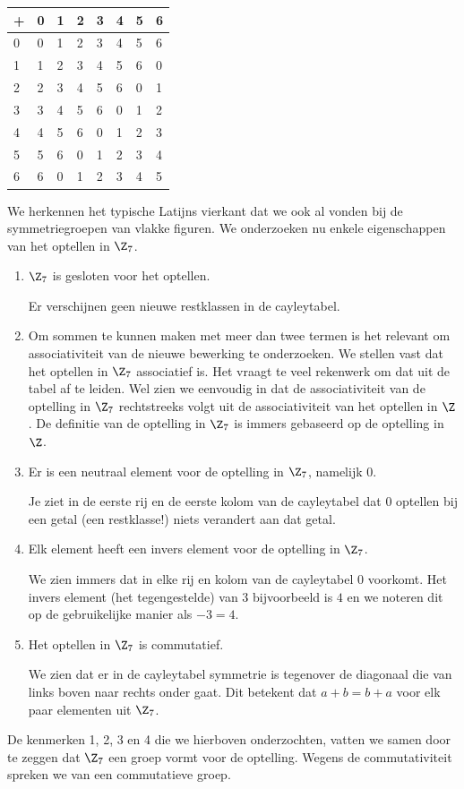 \begin{multicols}{2}
	\begin{tabel}
		\begin{tabular}{|C{0.5cm}|C{0.5cm}|C{0.5cm}|C{0.5cm}|C{0.5cm}|C{0.5cm}|C{0.5cm}|C{0.5cm}|}  
			\hline
			 +&0&1&2&3&4&5&6\\
			\hline 
			0&0&1&2&3&4&5&6\\
			1&1&2&3&4&5&6&0\\
			2&2&3&4&5&6&0&1\\
			3&3&4&5&6&0&1&2\\
			4&4&5&6&0&1&2&3\\
			5&5&6&0&1&2&3&4\\
			6&6&0&1&2&3&4&5\\
			\hline
		\end{tabular}
	\end{tabel}		
	
	We herkennen het typische Latijns vierkant dat we ook al vonden bij de symmetriegroepen van vlakke figuren. We onderzoeken nu enkele eigenschappen van het optellen in $\Z_7$.
		\begin{enumerate}
		\item $\Z_7$ is gesloten voor het optellen.\par
		Er verschijnen geen nieuwe restklassen in de cayleytabel.
		\item Om sommen te kunnen maken met meer dan twee termen is het relevant om associativiteit van de nieuwe bewerking te onderzoeken. We stellen vast dat het optellen in $\Z_7$ associatief is. Het vraagt te veel rekenwerk om dat uit de tabel af te leiden. Wel zien we eenvoudig in dat de associativiteit van de optelling in  $\Z_7$ rechtstreeks volgt uit de associativiteit van het optellen in $\Z$. De definitie van de optelling in $\Z_7$ is immers gebaseerd op de optelling in $\Z$.
		\item Er is een neutraal element voor de optelling in $\Z_7$, namelijk $0$. \par
		Je ziet in de eerste rij en de eerste kolom van de cayleytabel dat $0$ optellen bij een getal (een restklasse!) niets verandert aan dat getal.
		\item Elk element heeft een invers element voor de optelling in $\Z_7$. \par
		We zien immers dat in elke rij en kolom van de cayleytabel $0$ voorkomt. Het invers element (het tegengestelde) van $3$ bijvoorbeeld is $4$ en we noteren dit op de gebruikelijke manier als $-3=4$.
		\item Het optellen in $\Z_7$ is commutatief. \par
		We zien dat er in de cayleytabel symmetrie is tegenover de diagonaal die van links boven naar rechts onder gaat. Dit betekent dat $a+b=b+a$ voor elk paar elementen uit $\Z_7$.
		\end{enumerate}
	De kenmerken 1, 2, 3 en 4 die we hierboven onderzochten, vatten we samen door te zeggen dat $\Z_7$ een groep vormt voor de optelling. Wegens de commutativiteit spreken we van een commutatieve groep.
	

\end{multicols}
